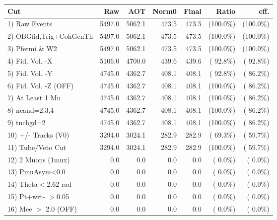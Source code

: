 \begin{table}[h!]\centering
 \begin{tabular}{||l||r|r|r|r|r|r||}
 \hline
 \hline
 Cut & Raw & AOT & Norm0 & Final & Ratio & eff.       \\
 \hline
  1) Raw Events           &       5497.0 &       5062.1 &        473.5 &        473.5 & (100.0\%) & (100.0\%) \\
  2) OBGfid,Trig+CohGenTh &       5497.0 &       5062.1 &        473.5 &        473.5 & (100.0\%) & (100.0\%) \\
  3) Pfermi \& W2         &       5497.0 &       5062.1 &        473.5 &        473.5 & (100.0\%) & (100.0\%) \\
  4) Fid. Vol. -X         &       5106.0 &       4700.0 &        439.6 &        439.6 & ( 92.8\%) & ( 92.8\%) \\
  5) Fid. Vol. -Y         &       4745.0 &       4362.7 &        408.1 &        408.1 & ( 92.8\%) & ( 86.2\%) \\
  6) Fid. Vol. -Z (OFF)   &       4745.0 &       4362.7 &        408.1 &        408.1 & (100.0\%) & ( 86.2\%) \\
  7) At Least 1 Mu        &       4745.0 &       4362.7 &        408.1 &        408.1 & (100.0\%) & ( 86.2\%) \\
  8) ncand=2,3,4          &       4745.0 &       4362.7 &        408.1 &        408.1 & (100.0\%) & ( 86.2\%) \\
  9) tnchgd=2             &       4745.0 &       4362.7 &        408.1 &        408.1 & (100.0\%) & ( 86.2\%) \\
 10) +/- Tracks (V0)      &       3294.0 &       3024.1 &        282.9 &        282.9 & ( 69.3\%) & ( 59.7\%) \\
 11) Tube/Veto Cut        &       3294.0 &       3024.1 &        282.9 &        282.9 & (100.0\%) & ( 59.7\%) \\
 12) 2 Muons (1mux)       &          0.0 &          0.0 &          0.0 &          0.0 & (  0.0\%) & (  0.0\%) \\
 13) PmuAsym<0.0          &          0.0 &          0.0 &          0.0 &          0.0 & (  0.0\%) & (  0.0\%) \\
 14) Theta$<$2.62 rad     &          0.0 &          0.0 &          0.0 &          0.0 & (  0.0\%) & (  0.0\%) \\
 15) Pt+wrt- $>$0.05      &          0.0 &          0.0 &          0.0 &          0.0 & (  0.0\%) & (  0.0\%) \\
 16) Mee $>$ 2.0  (OFF)   &          0.0 &          0.0 &          0.0 &          0.0 & (  0.0\%) & (  0.0\%) \\

\end{tabular}
\end{table}
